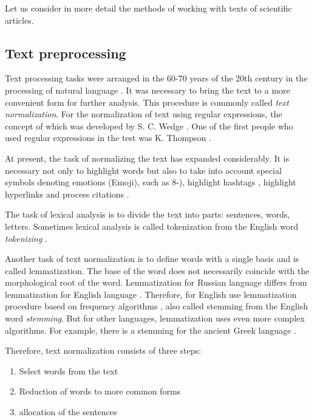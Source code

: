 \documentclass[12pt]{report}
\theoremstyle{definition}
\providecommand{\tightlist}{%
	\setlength{\itemsep}{0pt}\setlength{\parskip}{0pt}}
\begin{document}
Let us consider in more detail the methods of working with texts of scientific articles.

\subsection{Text preprocessing}
Text processing tasks were arranged in the 60-70 years of the 20th century in the processing of natural language \cite{weizenbaum1966eliza, kuvcera1967computational}.
It was necessary to bring the text to a more convenient form for further analysis.
This procedure is commonly called \textit{text normalization}.
For the normalization of text using regular expressions, the concept of which was developed by S. C. Wedge \cite{kleene1951representation}. 
One of the first people who used regular expressions in the test was K. Thompson \cite{thompson1968programming}.

At present, the task of normalizing the text has expanded considerably.
It is necessary not only to highlight words but also to take into account special symbols denoting emotions (Emoji), such as 8-)\cite{eisner2016emoji2vec}, highlight hashtags \cite{o2010tweets}, highlight hyperlinks \cite{bingel2017identifying} and process citations \cite{jha2017nlp}.

The task of lexical analysis is to divide the text into parts: sentences, words, letters.  
Sometimes lexical analysis is called tokenization from the English word \textit{tokenizing} \cite{lovins1968development}.

Another task of text normalization is to define words with a single basis and is called lemmatization. The base of the word does not necessarily coincide with the morphological root of the word.
Lemmatization for Russian language differs from lemmatization for English language \cite{segalovich2003fast, sharoff2011proper, korobov2015morphological}. 
Therefore, for English use lemmatization procedure based on frequency algorithms \cite{willett2006porter, porter2001snowball}, also called stemming from the English word \textit{stemming}. 
But for other languages, lemmatization uses even more complex algorithms. For example, there is a stemming for the ancient Greek language \cite{packard1973computer}.

Therefore, text normalization consists of three steps: 
\begin{enumerate}
	\tightlist
	\item Select words from the text
	\item Reduction of words to more common forms 
	\item allocation of the sentences
\end{enumerate}
\end{document}

